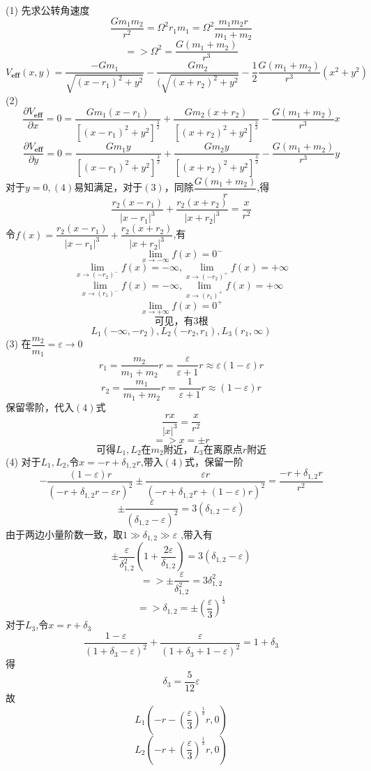 \documentclass{article}
\begin{document}
\[\]
(1)
先求公转角速度
\[
\dfrac{Gm_1 m_2}{r^2}=\Omega^2 r_1 m_1=\Omega^2 \dfrac{m_1 m_2 r}{m_1 +m_2}
\]
\[
=>\Omega^2=\dfrac{G(m_1+m_2)}{r^3}\tag{1}
\]
\[
V_{\mathbf{eff}}(x,y)=
\dfrac{-Gm_1}{\sqrt{(x-r_1)^2+y^2}}
-\dfrac{Gm_2}{(\sqrt{(x+r_2)^2+y^2}}
-\dfrac{1}{2}\dfrac{G(m_1+m_2)}{r^3}(x^2+y^2)\tag{2}
\]
(2)
\[
\dfrac{\partial V_{\mathbf{eff}}}{\partial x}
=0
=\dfrac{Gm_1(x-r_1)}{[(x-r_1)^2+y^{2}]^{\frac{3}{2}}}
+\dfrac{Gm_2(x+r_2)}{[(x+r_2)^2+y^{2}]^{\frac{3}{2}}}
-\dfrac{G(m_1+m_2)}{r^3}x
\tag{3}
\]
\[
\dfrac{\partial V_{\mathbf{eff}}}{\partial y}=0
=\dfrac{Gm_1 y}{[(x-r_1)^2+y^{2}]^{\frac{3}{2}}}
+\dfrac{Gm_2 y}{[(x+r_2)^2+y^{2}]^{\frac{3}{2}}}
-\dfrac{G(m_1+m_2)}{r^3}y
\tag{4}
\]
对于$y=0,(4)$易知满足，对于$(3)$，同除$\dfrac{G(m_1+m_2)}{r}$,得
\[
 \dfrac{r_2(x-r_1)}{|x-r_1|^3}
+\dfrac{r_2(x+r_2)}{|x+r_2|^3}
=\dfrac{x}{r^2}\tag{3'}
\]
令$f(x)=\dfrac{r_2(x-r_1)}{|x-r_1|^3}+\dfrac{r_2(x+r_2)}{|x+r_2|^3}$,有
\[
\lim_{x \to -\infty}f(x)=0^-\tag{5}
\]
\[
\lim_{x \to (-r_2)^-}f(x)=-\infty,\lim_{x \to (-r_2)^+}f(x)=+\infty\tag{6}
\]
\[
\lim_{x \to (r_1)^-}f(x)=-\infty,\lim_{x \to (r_1)^+}f(x)=+\infty\tag{7}
\]
\[
\lim_{x \to +\infty}f(x)=0^+\tag{8}
\]
\[可见，有3根\tag{9}\]
\[L_1(-\infty,-r_2),L_2(-r_2,r_1),L_3(r_1,\infty)\tag{10}\]
(3)
在$\dfrac{m_2}{m_1}=\varepsilon\to 0$
\[
r_1=\dfrac{m_2}{m_1+m_2}r=\dfrac{\varepsilon}{\varepsilon+1}r\approx \varepsilon(1-\varepsilon)r\tag{11}
\]
\[
r_2=\dfrac{m_1}{m_1+m_2}r=\dfrac{1}{\varepsilon+1}r\approx (1-\varepsilon)r\tag{12}
\]
保留零阶，代入$(4)$式
\[
\dfrac{rx}{|x|^3}=\dfrac{x}{r^2}\tag{13}
\]
\[
=>x=\pm r\tag{14}
\]
\[
可得L_1,L_2在m_2附近，L_3在离原点r附近\tag{15}
\]
(4)
对于$L_1,L_2$,令$x=-r+\delta_{1,2}r$,带入$(4)$式，保留一阶
\[
-\dfrac{(1-\varepsilon)r}{(-r+\delta_{1,2}r-\varepsilon r)^2}
\pm 
\dfrac{\varepsilon r}{(-r + \delta_{1,2} r +(1-\varepsilon)r)^2}=\dfrac{-r+\delta_{1,2}r}{r^2}\tag{16}
\]
\[
\pm \dfrac{\varepsilon}{(\delta_{1,2}-\varepsilon)^2}=3(\delta_{1,2}-\varepsilon)
\]
由于两边小量阶数一致，取$1\gg\delta_{1,2}\gg\varepsilon$ ,带入有
\[
\pm \dfrac{\varepsilon}{\delta_{1,2}^2}\left(1+\dfrac{2\varepsilon}{\delta_{1,2}}\right)=3(\delta_{1,2}-\varepsilon)
\]
\[
=>\pm  \dfrac{\varepsilon}{\delta_{1,2}^2}=3 \delta_{1,2}^2
\]
\[
=>\delta_{1,2}= \pm \left(\dfrac{\varepsilon}{3}\right)^{\frac{1}{3}}\tag{17}
\]
对于$L_3$,令$x=r+\delta_3$
\[
\dfrac{1-\varepsilon}{(1+\delta_3-\varepsilon)^2}+\dfrac{\varepsilon}{(1+\delta_3+1-\varepsilon)^2}=1+\delta_3\tag{18}
\]
得
\[
\delta_3=\dfrac{5}{12}\varepsilon\tag{19}
\]
故
\[
L_1\left(-r-(\dfrac{\varepsilon}{3})^{\frac{1}{3}}r,0\right)\tag{20}
\]
\[
L_2\left(-r+(\dfrac{\varepsilon}{3})^{\frac{1}{3}}r,0\right)\tag{21}
\]
\end{document}
